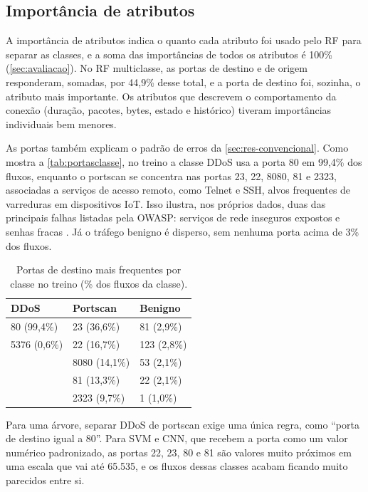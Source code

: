 \documentclass[alpha-refs,brazilian]{CC-EC_TF-TC}
\begin{document}
\subsection{Importância de atributos}
\label{sec:res-importancia}

A importância de atributos indica o quanto cada atributo foi usado pelo RF para separar as classes, e a soma das importâncias de todos os atributos é 100\% (\autoref{sec:avaliacao}). No RF multiclasse, as portas de destino e de origem responderam, somadas, por 44,9\% desse total, e a porta de destino foi, sozinha, o atributo mais importante. Os atributos que descrevem o comportamento da conexão (duração, pacotes, bytes, estado e histórico) tiveram importâncias individuais bem menores.

As portas também explicam o padrão de erros da \autoref{sec:res-convencional}. Como mostra a \autoref{tab:portasclasse}, no treino a classe DDoS usa a porta 80 em 99,4\% dos fluxos, enquanto o portscan se concentra nas portas 23, 22, 8080, 81 e 2323, associadas a serviços de acesso remoto, como Telnet e SSH, alvos frequentes de varreduras em dispositivos IoT. Isso ilustra, nos próprios dados, duas das principais falhas listadas pela OWASP: serviços de rede inseguros expostos e senhas fracas \citep{owasp2018iot}. Já o tráfego benigno é disperso, sem nenhuma porta acima de 3\% dos fluxos.

\begin{table}[htbp]
\centering
\caption{Portas de destino mais frequentes por classe no treino (\% dos fluxos da classe).}
\label{tab:portasclasse}
\small
\begin{tabular}{lll}
\toprule
\textbf{DDoS} & \textbf{Portscan} & \textbf{Benigno} \\
\midrule
80 (99,4\%)  & 23 (36,6\%)   & 81 (2,9\%) \\
5376 (0,6\%) & 22 (16,7\%)   & 123 (2,8\%) \\
             & 8080 (14,1\%) & 53 (2,1\%) \\
             & 81 (13,3\%)   & 22 (2,1\%) \\
             & 2323 (9,7\%)  & 1 (1,0\%) \\
\bottomrule
\end{tabular}
\end{table}

Para uma árvore, separar DDoS de portscan exige uma única regra, como ``porta de destino igual a 80''. Para SVM e CNN, que recebem a porta como um valor numérico padronizado, as portas 22, 23, 80 e 81 são valores muito próximos em uma escala que vai até 65.535, e os fluxos dessas classes acabam ficando muito parecidos entre si.
\end{document}

